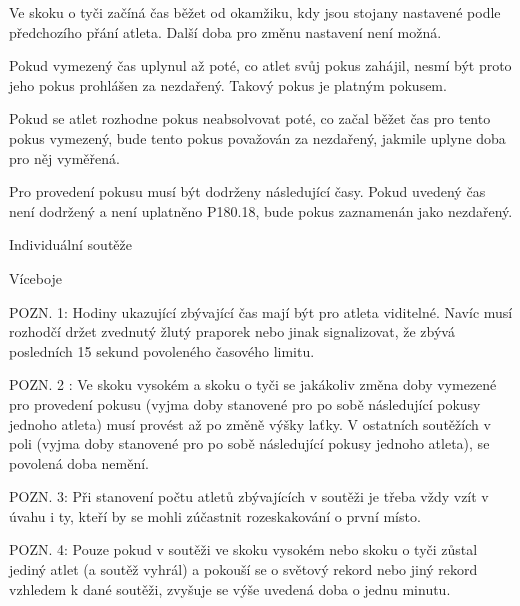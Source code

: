Ve skoku o tyči začíná čas běžet od okamžiku, kdy jsou stojany nastavené podle předchozího přání atleta. Další doba pro změnu nastavení není možná.

Pokud vymezený čas uplynul až poté, co atlet svůj pokus zahájil, nesmí být proto jeho pokus prohlášen za nezdařený. Takový pokus je platným pokusem.

Pokud se atlet rozhodne pokus neabsolvovat poté, co začal běžet čas pro tento pokus vymezený, bude tento pokus považován za nezdařený, jakmile uplyne doba pro něj vyměřená.

Pro provedení pokusu musí být dodrženy následující časy. Pokud uvedený čas není dodržený a není uplatněno P180.18, bude pokus zaznamenán jako nezdařený.

Individuální soutěže


Víceboje


POZN. 1: Hodiny ukazující zbývající čas mají být pro atleta viditelné. Navíc musí rozhodčí držet zvednutý žlutý praporek nebo jinak signalizovat, že zbývá posledních 15 sekund povoleného časového limitu.

POZN. 2 : Ve skoku vysokém a skoku o tyči se jakákoliv změna doby vymezené pro provedení pokusu (vyjma doby stanovené pro po sobě následující pokusy jednoho atleta) musí provést až po změně výšky laťky. V ostatních soutěžích v poli (vyjma doby stanovené pro po sobě následující pokusy jednoho atleta), se povolená doba nemění.

POZN. 3: Při stanovení počtu atletů zbývajících v soutěži je třeba vždy vzít v úvahu i ty, kteří by se mohli zúčastnit rozeskakování o první místo.

POZN. 4: Pouze pokud v soutěži ve skoku vysokém nebo skoku o tyči zůstal jediný atlet (a soutěž vyhrál) a pokouší se o světový rekord nebo jiný rekord vzhledem k dané soutěži, zvyšuje se výše uvedená doba o jednu minutu.

